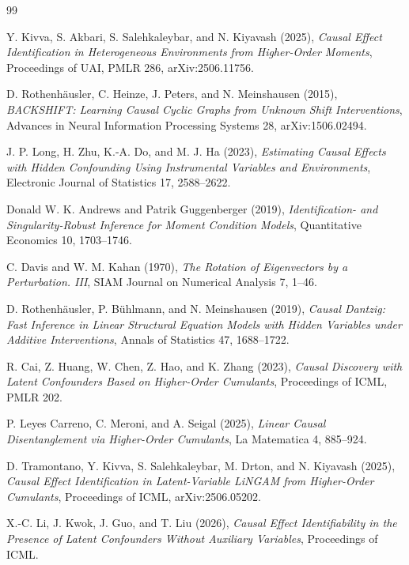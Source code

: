 \documentclass{article}
\begin{document}
\begin{thebibliography}{99}

   Y. Kivva, S. Akbari, S. Salehkaleybar, and N. Kiyavash (2025), \emph{Causal Effect Identification in Heterogeneous Environments from Higher-Order Moments}, Proceedings of UAI, PMLR 286, arXiv:2506.11756.

   D. Rothenhäusler, C. Heinze, J. Peters, and N. Meinshausen (2015), \emph{BACKSHIFT: Learning Causal Cyclic Graphs from Unknown Shift Interventions}, Advances in Neural Information Processing Systems 28, arXiv:1506.02494.

   J. P. Long, H. Zhu, K.-A. Do, and M. J. Ha (2023), \emph{Estimating Causal Effects with Hidden Confounding Using Instrumental Variables and Environments}, Electronic Journal of Statistics 17, 2588--2622.

   Donald W. K. Andrews and Patrik Guggenberger (2019), \emph{Identification- and Singularity-Robust Inference for Moment Condition Models}, Quantitative Economics 10, 1703--1746.

   C. Davis and W. M. Kahan (1970), \emph{The Rotation of Eigenvectors by a Perturbation. III}, SIAM Journal on Numerical Analysis 7, 1--46.

   D. Rothenhäusler, P. Bühlmann, and N. Meinshausen (2019), \emph{Causal Dantzig: Fast Inference in Linear Structural Equation Models with Hidden Variables under Additive Interventions}, Annals of Statistics 47, 1688--1722.

   R. Cai, Z. Huang, W. Chen, Z. Hao, and K. Zhang (2023), \emph{Causal Discovery with Latent Confounders Based on Higher-Order Cumulants}, Proceedings of ICML, PMLR 202.

   P. Leyes Carreno, C. Meroni, and A. Seigal (2025), \emph{Linear Causal Disentanglement via Higher-Order Cumulants}, La Matematica 4, 885--924.

   D. Tramontano, Y. Kivva, S. Salehkaleybar, M. Drton, and N. Kiyavash (2025), \emph{Causal Effect Identification in Latent-Variable LiNGAM from Higher-Order Cumulants}, Proceedings of ICML, arXiv:2506.05202.

   X.-C. Li, J. Kwok, J. Guo, and T. Liu (2026), \emph{Causal Effect Identifiability in the Presence of Latent Confounders Without Auxiliary Variables}, Proceedings of ICML.


\end{thebibliography}
\end{document}

